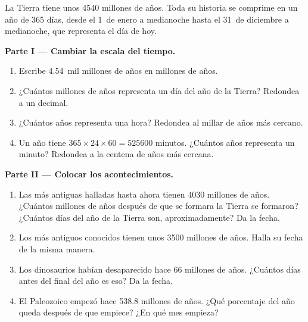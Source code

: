 \begin{problem}
\label{pb:g7:geological-time:1}
La Tierra tiene unos \num{4540} millones de años. Toda su historia se
comprime en un año de 365 días, desde el 1~de enero a medianoche hasta el
31~de diciembre a medianoche, que representa el día de hoy.

\medskip
\noindent\textbf{Parte I --- Cambiar la escala del tiempo.}\par\nopagebreak
\begin{enumerate}[beginpenalty=10000]
  \item Escribe \num{4.54}~mil millones de años en millones de años.
  \item ¿Cuántos millones de años representa un día del año de la Tierra?
        Redondea a un decimal.
  \item ¿Cuántos años representa una hora? Redondea al millar de años más
        cercano.
  \item Un año tiene $365 \times 24 \times 60 = \num{525600}$ minutos.
        ¿Cuántos años representa un minuto? Redondea a la centena de años
        más cercana.
\end{enumerate}

\medskip
\noindent\textbf{Parte II --- Colocar los acontecimientos.}\par\nopagebreak
\begin{enumerate}[resume, beginpenalty=10000]
  \item Las  más antiguas halladas hasta ahora tienen \num{4030}
        millones de años. ¿Cuántos millones de años después de que se
        formara la Tierra se formaron? ¿Cuántos días del año de la Tierra
        son, aproximadamente? Da la fecha.
  \item Los  más antiguos conocidos tienen unos \num{3500} millones
        de años. Halla su fecha de la misma manera.
  \item Los dinosaurios habían desaparecido hace \num{66} millones de años.
        ¿Cuántos días antes del final del año es eso? Da la fecha.
  \item El Paleozoico empezó hace \num{538.8} millones de años. ¿Qué
        porcentaje del año queda después de que empiece? ¿En qué mes
        empieza?
\end{enumerate}


\end{problem}
